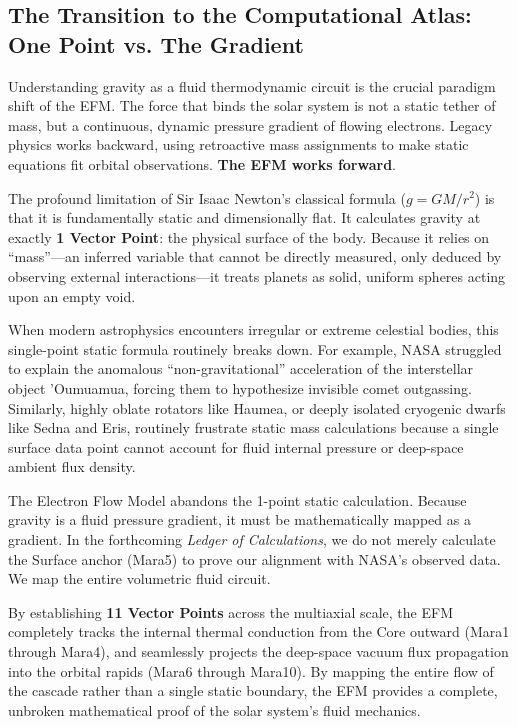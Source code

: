 \documentclass[11pt, a4paper]{article}
\begin{document}
\subsection{The Transition to the Computational Atlas: One Point vs. The Gradient}
Understanding gravity as a fluid thermodynamic circuit is the crucial paradigm shift of the EFM. The force that binds the solar system is not a static tether of mass, but a continuous, dynamic pressure gradient of flowing electrons. Legacy physics works backward, using retroactive mass assignments to make static equations fit orbital observations. \textbf{The EFM works forward}.

The profound limitation of Sir Isaac Newton's classical formula ($g = GM/r^2$) is that it is fundamentally static and dimensionally flat. It calculates gravity at exactly \textbf{1 Vector Point}: the physical surface of the body. Because it relies on ``mass''—an inferred variable that cannot be directly measured, only deduced by observing external interactions—it treats planets as solid, uniform spheres acting upon an empty void. 

When modern astrophysics encounters irregular or extreme celestial bodies, this single-point static formula routinely breaks down. For example, NASA struggled to explain the anomalous ``non-gravitational'' acceleration of the interstellar object 'Oumuamua, forcing them to hypothesize invisible comet outgassing. Similarly, highly oblate rotators like Haumea, or deeply isolated cryogenic dwarfs like Sedna and Eris, routinely frustrate static mass calculations because a single surface data point cannot account for fluid internal pressure or deep-space ambient flux density. 

The Electron Flow Model abandons the 1-point static calculation. Because gravity is a fluid pressure gradient, it must be mathematically mapped as a gradient. In the forthcoming \textit{Ledger of Calculations}, we do not merely calculate the Surface anchor (Mara5) to prove our alignment with NASA's observed data. We map the entire volumetric fluid circuit. 

By establishing \textbf{11 Vector Points} across the multiaxial scale, the EFM completely tracks the internal thermal conduction from the Core outward (Mara1 through Mara4), and seamlessly projects the deep-space vacuum flux propagation into the orbital rapids (Mara6 through Mara10). By mapping the entire flow of the cascade rather than a single static boundary, the EFM provides a complete, unbroken mathematical proof of the solar system's fluid mechanics.
\end{document}
